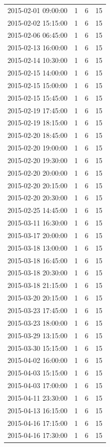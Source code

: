 \begin{tabular}{lrrr}
2015-02-01 09:00:00 & 1 & 6 & 15 \\
2015-02-02 15:15:00 & 1 & 6 & 15 \\
2015-02-06 06:45:00 & 1 & 6 & 15 \\
2015-02-13 16:00:00 & 1 & 6 & 15 \\
2015-02-14 10:30:00 & 1 & 6 & 15 \\
2015-02-15 14:00:00 & 1 & 6 & 15 \\
2015-02-15 15:00:00 & 1 & 6 & 15 \\
2015-02-15 15:45:00 & 1 & 6 & 15 \\
2015-02-19 17:45:00 & 1 & 6 & 15 \\
2015-02-19 18:15:00 & 1 & 6 & 15 \\
2015-02-20 18:45:00 & 1 & 6 & 15 \\
2015-02-20 19:00:00 & 1 & 6 & 15 \\
2015-02-20 19:30:00 & 1 & 6 & 15 \\
2015-02-20 20:00:00 & 1 & 6 & 15 \\
2015-02-20 20:15:00 & 1 & 6 & 15 \\
2015-02-20 20:30:00 & 1 & 6 & 15 \\
2015-02-25 14:45:00 & 1 & 6 & 15 \\
2015-03-11 16:30:00 & 1 & 6 & 15 \\
2015-03-17 20:00:00 & 1 & 6 & 15 \\
2015-03-18 13:00:00 & 1 & 6 & 15 \\
2015-03-18 16:45:00 & 1 & 6 & 15 \\
2015-03-18 20:30:00 & 1 & 6 & 15 \\
2015-03-18 21:15:00 & 1 & 6 & 15 \\
2015-03-20 20:15:00 & 1 & 6 & 15 \\
2015-03-23 17:45:00 & 1 & 6 & 15 \\
2015-03-23 18:00:00 & 1 & 6 & 15 \\
2015-03-29 13:15:00 & 1 & 6 & 15 \\
2015-03-30 15:15:00 & 1 & 6 & 15 \\
2015-04-02 16:00:00 & 1 & 6 & 15 \\
2015-04-03 15:15:00 & 1 & 6 & 15 \\
2015-04-03 17:00:00 & 1 & 6 & 15 \\
2015-04-11 23:30:00 & 1 & 6 & 15 \\
2015-04-13 16:15:00 & 1 & 6 & 15 \\
2015-04-16 17:15:00 & 1 & 6 & 15 \\
2015-04-16 17:30:00 & 1 & 6 & 15 \\

\end{tabular}

